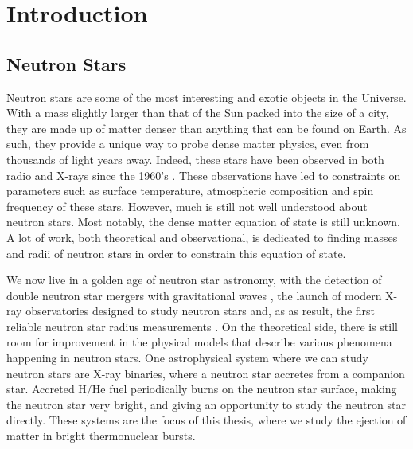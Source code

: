 \documentclass[../main.tex]{subfiles}
\begin{document}
\chapter{Introduction}\label{chapter1}
\section{Neutron Stars}\label{section:neutron_stars}
Neutron stars are some of the most interesting and exotic objects in the Universe.  With a mass slightly larger than that of the Sun packed into the size of a city, they are made up of matter denser than anything that can be found on Earth.  As such, they provide a unique way to probe dense matter physics, even from thousands of light years away.  Indeed, these stars have been observed in both radio and X-rays since the 1960's \citep{Hewish1968,Shklovsky1967}.  These observations have led to constraints on parameters such as surface temperature, atmospheric composition and spin frequency of these stars. However, much is still not well understood about neutron stars. Most notably, the dense matter equation of state is still unknown. A lot of work, both theoretical and observational, is dedicated to finding masses and radii of neutron stars in order to constrain this equation of state.
 
We now live in a golden age of neutron star astronomy, with the detection of double neutron star mergers with gravitational waves \citep{Abbott2017}, the launch of modern X-ray observatories designed to study neutron stars and, as as result, the first reliable neutron star radius measurements \citep{Gendreau2017,Miller2019}. On the theoretical side, there is still room for improvement in the physical models that describe various phenomena happening in neutron stars. One astrophysical system where we can study neutron stars are X-ray binaries, where a neutron star accretes from a companion star. Accreted H/He fuel periodically burns on the neutron star surface, making the neutron star very bright, and giving an opportunity to study the neutron star directly. These systems are the focus of this thesis, where we study the ejection of matter in bright thermonuclear bursts. %

 
\end{document}

